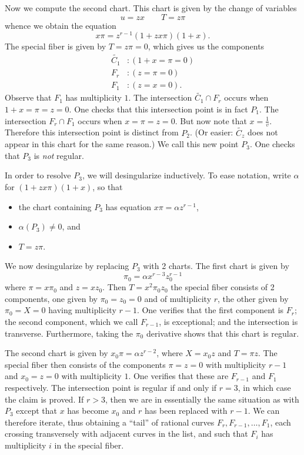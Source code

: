 \documentclass{article}
\theoremstyle{plain}
\theoremstyle{definition}
\theoremstyle{remark}
\renewcommand{\tilde}[1]{\widetilde{#1}}
\begin{document}
Now we compute the second chart. This chart is given by the change of variables
\[
u=zx \qquad T=z\pi
\]
whence we obtain the equation
\[
x\pi = z^{r-1}(1 + zx\pi)(1 + x).
\]
The special fiber is given by $T = z\pi = 0$, which gives us the components
\begin{align*}
  \tilde{C_1}&: (1 + x = \pi = 0) \\
  F_r&: (z = \pi = 0) \\
  F_1&: (z = x = 0).
\end{align*}
Observe that $F_1$ has multiplicity $1$. The intersection $\tilde{C_1} \cap F_r$ occurs when $1 + x = \pi = z = 0$. One checks that this intersection point is in fact $P_1$. The intersection $F_r \cap F_1$ occurs when $x = \pi = z = 0$. But now note that $x = \frac{1}{v}$. Therefore this intersection point is distinct from $P_2$. (Or easier: $\tilde{C_z}$ does not appear in this chart for the same reason.) We call this new point $P_3$. One checks that $P_3$ is \emph{not} regular.

In order to resolve $P_3$, we will desingularize inductively. To ease notation, write $\alpha$ for $(1 + zx\pi)(1 + x)$, so that
\begin{itemize}
    \item the chart containing $P_3$ has equation $x\pi = \alpha z^{r-1}$,
    \item $\alpha(P_3) \neq 0$, and
    \item $T = z\pi$.
\end{itemize}

We now desingularize by replacing $P_3$ with 2 charts. The first chart is given by
\[
\pi_0 = \alpha x^{r-3} z_0^{r-1}
\]
where $\pi = x \pi_0$ and $z = x z_0$. Then $T = x^2 \pi_0 z_0$ the special fiber consists of 2 components, one given by $\pi_0 = z_0 = 0$ and of multiplicity $r$, the other given by $\pi_0 = X = 0$ having multiplicity $r-1$. One verifies that the first component is $F_r$; the second component, which we call $F_{r-1}$, is exceptional; and the intersection is transverse. Furthermore, taking the $\pi_0$ derivative shows that this chart is regular.

  The second chart is given by $x_0 \pi = \alpha z^{r-2}$, where $X = x_0 z$ and $T = \pi z$. The special fiber then consists of the components $\pi = z = 0$ with multiplicity $r-1$ and $x_0 = z = 0$ with multiplicity $1$. One verifies that these are $F_{r-1}$ and $F_1$ respectively. The intersection point is regular if and only if $r = 3$, in which case the claim is proved. If $r > 3$, then we are in essentially the same situation as with $P_3$ except that $x$ has become $x_0$ and $r$ has been replaced with $r-1$. We can therefore iterate, thus obtaining a ``tail'' of rational curves $F_r, F_{r-1}, \dots, F_1$, each crossing transversely with adjacent curves in the list, and such that $F_i$ has multiplicity $i$ in the special fiber.
\end{document}
